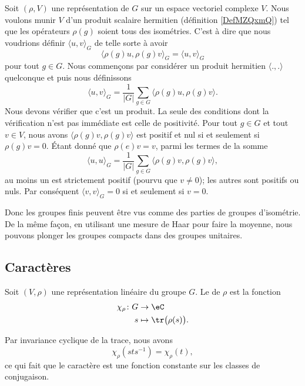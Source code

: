 Soit \( (\rho,V)\) une représentation de \( G\) sur un espace vectoriel complexe \( V\). Nous voulons munir \( V\) d'un produit scalaire hermitien (définition \ref{DefMZQxmQ}) tel que les opérateurs \( \rho(g)\) soient tous des isométries. C'est à dire que nous voudrions définir \( \langle u, v\rangle_G\) de telle sorte à avoir
\begin{equation}
    \langle \rho(g)u, \rho(g)v\rangle_G =\langle u, v\rangle_G
\end{equation}
pour tout \( g\in G\). Nous commençons par considérer un produit hermitien \( \langle ., .\rangle \) quelconque et puis nous définissons
\begin{equation}
    \langle u, v\rangle_G=\frac{1}{ | G | }\sum_{g\in G}\langle \rho(g)u, \rho(g)v\rangle.
\end{equation}
Nous devons vérifier que c'est un produit. La seule des conditions dont la vérification n'est pas immédiate est celle de positivité. Pour tout \( g\in G\) et tout \( v\in V\), nous avons \( \langle \rho(g)v, \rho(g)v\rangle \) est positif et nul si et seulement si \( \rho(g)v=0\). Étant donné que \( \rho(e)v=v\), parmi les termes de la somme
\begin{equation}
    \langle u, u\rangle_G=\frac{1}{ | G | }\sum_{g\in G}\langle \rho(g)v, \rho(g)v\rangle,
\end{equation}
au moins un est strictement positif (pourvu que \( v\neq 0\)); les autres sont positifs ou nuls. Par conséquent \( \langle v, v\rangle_G=0\) si et seulement si \( v=0\).

Donc les groupes finis peuvent être vus comme des parties de groupes d'isométrie. De la même façon, en utilisant une mesure de Haar pour faire la moyenne, nous pouvons plonger les groupes compacts dans des groupes unitaires.

\subsection{Caractères}

\begin{definition}
    Soit \( (V,\rho)\) une représentation linéaire du groupe \( G\). Le  de \( \rho\) est la fonction
    \begin{equation}
        \begin{aligned}
            \chi_{\rho}\colon G&\to \eC \\
            s&\mapsto \tr\big( \rho(s) \big).
        \end{aligned}
    \end{equation}
\end{definition}
Par invariance cyclique de la trace, nous avons
\begin{equation}
    \chi_{\rho}(sts^{-1})=\chi_{\rho}(t),
\end{equation}
ce qui fait que le caractère est une fonction constante sur les classes de conjugaison.

